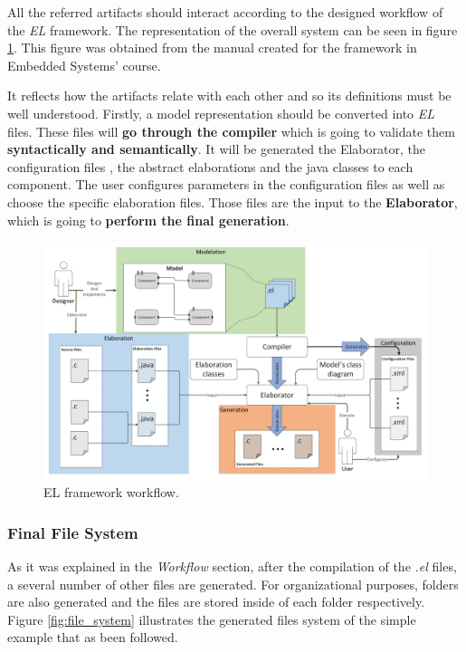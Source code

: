 \documentclass[12pt]{article}
\begin{document}
{All the referred artifacts should interact according to the designed workflow of the \textit{EL} framework. The representation of the overall system can be seen in figure \ref{fig:workflow}. This figure was obtained from the manual created for the framework in Embedded Systems' course. 

It reflects how the artifacts relate with each other and so its definitions must be well understood. Firstly, a model representation should be converted into \textit{EL} files. These files will \textbf{go through the compiler} which is going to validate them \textbf{syntactically and semantically}. It will be generated the Elaborator, the configuration files , the abstract elaborations and the java classes to each component. The user configures parameters in the configuration files as well as choose the specific elaboration files. Those files are the input to the \textbf{Elaborator}, which is going to \textbf{perform the final generation}.

\begin{figure}[H]
\centerline{
\includegraphics[scale=0.3]{images/EL_workflow} }
\caption{EL framework workflow.}
\label{fig:workflow} 
\end{figure}



\subsubsection{Final File System}

As it was explained in the \textit{Workflow} section, after the compilation of the \textit{.el} files, a several number of other files are generated. For organizational purposes,  folders are also generated and the files are stored inside of each folder respectively. Figure \ref{fig:file_system} illustrates the generated files system of the simple example that as been followed.   


}
\end{document}
